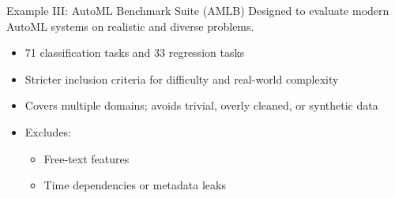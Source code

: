 \documentclass[11pt,compress,t,notes=noshow, xcolor=table]{beamer}
\begin{document}
\begin{vbframe}{Example III: AutoML Benchmark Suite (AMLB) }
\vfill
Designed to evaluate modern AutoML systems on realistic and diverse problems.
\vspace{0.5em}
\begin{itemize}
    \item 71 classification tasks and 33 regression tasks
    \item Stricter inclusion criteria for difficulty and real-world complexity
    \item Covers multiple domains; avoids trivial, overly cleaned, or synthetic data
    \item Excludes:
    \begin{itemize}
        \item Free-text features
        \item Time dependencies or metadata leaks
    \end{itemize}
\end{itemize}
\vfill
\end{vbframe}




    
\end{document}
